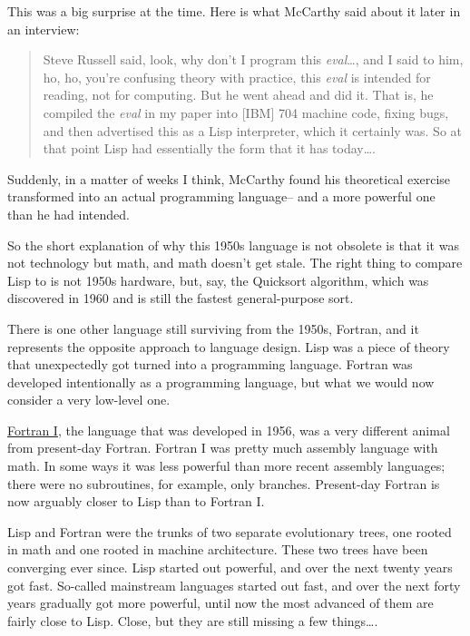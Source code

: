 This was a big surprise at the time. Here is what McCarthy said about it
later in an interview:

\begin{quote}
Steve Russell said, look, why don't I program this \emph{eval}\ldots,
and I said to him, ho, ho, you're confusing theory with practice, this
\emph{eval} is intended for reading, not for computing. But he went
ahead and did it. That is, he compiled the \emph{eval} in my paper into
{[}IBM{]} 704 machine code, fixing bugs, and then advertised this as a
Lisp interpreter, which it certainly was. So at that point Lisp had
essentially the form that it has today\ldots.
\end{quote}

Suddenly, in a matter of weeks I think, McCarthy found his theoretical
exercise transformed into an actual programming language-- and a more
powerful one than he had intended.

So the short explanation of why this 1950s language is not obsolete is
that it was not technology but math, and math doesn't get stale. The
right thing to compare Lisp to is not 1950s hardware, but, say, the
Quicksort algorithm, which was discovered in 1960 and is still the
fastest general-purpose sort.

There is one other language still surviving from the 1950s, Fortran, and
it represents the opposite approach to language design. Lisp was a piece
of theory that unexpectedly got turned into a programming language.
Fortran was developed intentionally as a programming language, but what
we would now consider a very low-level one.

\href{history.html}{Fortran I}, the language that was developed in 1956,
was a very different animal from present-day Fortran. Fortran I was
pretty much assembly language with math. In some ways it was less
powerful than more recent assembly languages; there were no subroutines,
for example, only branches. Present-day Fortran is now arguably closer
to Lisp than to Fortran I.

Lisp and Fortran were the trunks of two separate evolutionary trees, one
rooted in math and one rooted in machine architecture. These two trees
have been converging ever since. Lisp started out powerful, and over the
next twenty years got fast. So-called mainstream languages started out
fast, and over the next forty years gradually got more powerful, until
now the most advanced of them are fairly close to Lisp. Close, but they
are still missing a few things\ldots.


